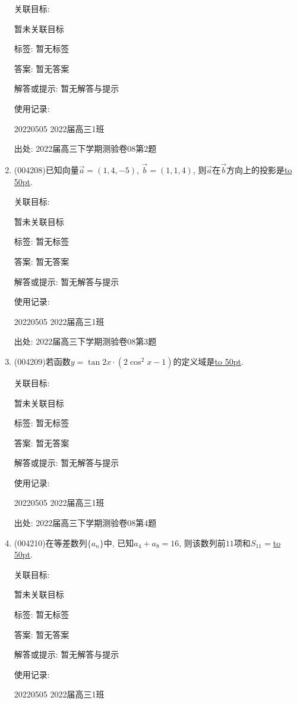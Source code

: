 \documentclass[10pt,a4paper]{article}
\newcommand{\blank}[1]{\underline{\hbox to #1pt{}}}
\begin{document}
\begin{enumerate}[1.]
关联目标:

暂未关联目标



标签: 暂无标签

答案: 暂无答案

解答或提示: 暂无解答与提示

使用记录:

20220505	2022届高三1班	


出处: 2022届高三下学期测验卷08第2题
\item { (004208)}已知向量$\overrightarrow a=(1,4,-5)$, $\overrightarrow b=(1,1,4)$, 则$\overrightarrow a$在$\overrightarrow b$方向上的投影是\blank{50}.


关联目标:

暂未关联目标



标签: 暂无标签

答案: 暂无答案

解答或提示: 暂无解答与提示

使用记录:

20220505	2022届高三1班	


出处: 2022届高三下学期测验卷08第3题
\item { (004209)}若函数$y=\tan 2x\cdot(2\cos^2x-1)$的定义域是\blank{50}.


关联目标:

暂未关联目标



标签: 暂无标签

答案: 暂无答案

解答或提示: 暂无解答与提示

使用记录:

20220505	2022届高三1班	


出处: 2022届高三下学期测验卷08第4题
\item { (004210)}在等差数列$\{a_n\}$中, 已知$a_4+a_8=16$, 则该数列前$11$项和$S_{11}=$\blank{50}.


关联目标:

暂未关联目标



标签: 暂无标签

答案: 暂无答案

解答或提示: 暂无解答与提示

使用记录:

20220505	2022届高三1班	



\end{enumerate}
\end{document}
